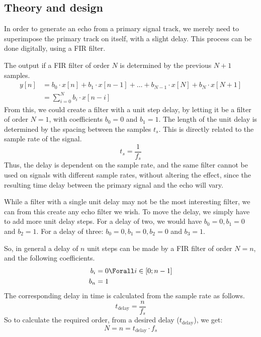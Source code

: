 
\subsection{Theory and design}
In order to generate an echo from a primary signal track, we merely need to superimpose the primary track on itself, with a slight delay. This process can be done digitally, using a FIR filter.

The output if a FIR filter of order $N$ is determined by the previous $N + 1$ samples.
\begin{align}
y[n] & = b_{0} \cdot x[n] + b_{1} \cdot x[n - 1] + \dots + b_{N - 1} \cdot x[N] + b_{N} \cdot x[N + 1] \nonumber \\
& = \sum_{i = 0}^{N} b_{i} \cdot x[n - i]
\end{align}
From this, we could create a filter with a unit step delay, by letting it be a filter of order $N = 1$, with coefficients $b_{0} = 0$ and $b_{1} = 1$. The length of the unit delay is determined by the spacing between the samples $t_{s}$. This is directly related to the sample rate of the signal.
\begin{equation}
t_{s} = \frac{1}{f_{s}}
\end{equation}
Thus, the delay is dependent on the sample rate, and the same filter cannot be used on signals with different sample rates, without altering the effect, since the resulting time delay between the primary signal and the echo will vary.

While a filter with a single unit delay may not be the most interesting filter, we can from this create any echo filter we wish. To move the delay, we simply have to add more unit delay steps. For a delay of two, we would have $b_{0} = 0, b_{1} = 0$ and $b_{2} = 1$. For a delay of three: $b_{0} = 0, b_{1} = 0, b_{2} = 0$ and $b_{3} = 1$.

So, in general a delay of $n$ unit steps can be made by a FIR filter of order $N = n$, and the following coefficients.
\begin{align}
b_{i} & = 0 \Forall i \in [0; n - 1] \nonumber \\
b_{n} & = 1
\label{eqn:echocoeff}
\end{align}
The corresponding delay in time is calculated from the sample rate as follows.
\begin{equation}
t_{\textrm{delay}} = \frac{n}{f_{s}}
\end{equation}
So to calculate the required order, from a desired delay ($t_{\textrm{delay}}$), we get:
\begin{equation}
N = n = t_{\textrm{delay}} \cdot f_{s}
\end{equation}

